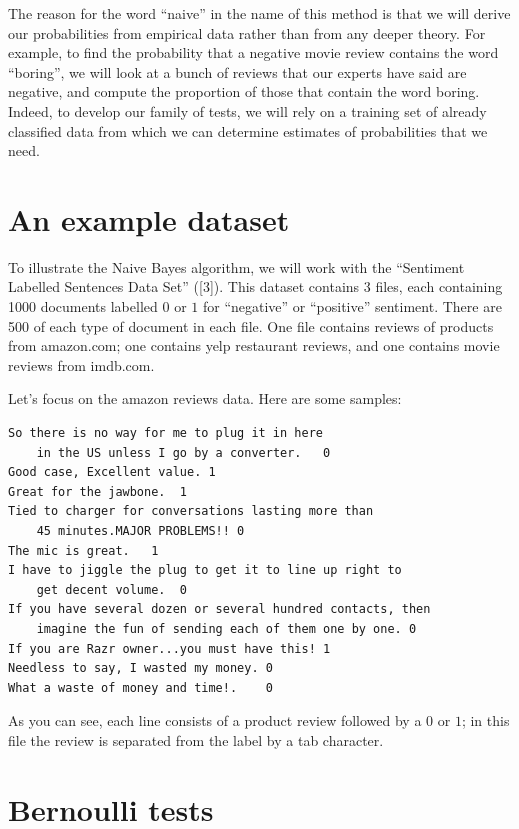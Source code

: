 \documentclass[
  11pt,
  letterpaper,
]{scrbook}
\theoremstyle{plain}
\theoremstyle{remark}
\begin{document}
The reason for the word ``naive'' in the name of this method is that we
will derive our probabilities from empirical data rather than from any
deeper theory. For example, to find the probability that a negative
movie review contains the word ``boring'', we will look at a bunch of
reviews that our experts have said are negative, and compute the
proportion of those that contain the word boring. Indeed, to develop our
family of tests, we will rely on a training set of already classified
data from which we can determine estimates of probabilities that we
need.

\hypertarget{an-example-dataset}{%
\section{An example dataset}\label{an-example-dataset}}

To illustrate the Naive Bayes algorithm, we will work with the
``Sentiment Labelled Sentences Data Set'' ({[}3{]}). This dataset
contains 3 files, each containing 1000 documents labelled \(0\) or \(1\)
for ``negative'' or ``positive'' sentiment. There are 500 of each type
of document in each file. One file contains reviews of products from
amazon.com; one contains yelp restaurant reviews, and one contains movie
reviews from imdb.com.

Let's focus on the amazon reviews data. Here are some samples:

\begin{verbatim}
So there is no way for me to plug it in here 
    in the US unless I go by a converter.   0
Good case, Excellent value. 1
Great for the jawbone.  1
Tied to charger for conversations lasting more than 
    45 minutes.MAJOR PROBLEMS!! 0
The mic is great.   1
I have to jiggle the plug to get it to line up right to 
    get decent volume.  0
If you have several dozen or several hundred contacts, then 
    imagine the fun of sending each of them one by one. 0
If you are Razr owner...you must have this! 1
Needless to say, I wasted my money. 0
What a waste of money and time!.    0
\end{verbatim}

As you can see, each line consists of a product review followed by a
\(0\) or \(1\); in this file the review is separated from the label by a
tab character.

\hypertarget{bernoulli-tests}{%
\section{Bernoulli tests}\label{bernoulli-tests}}
\end{document}
